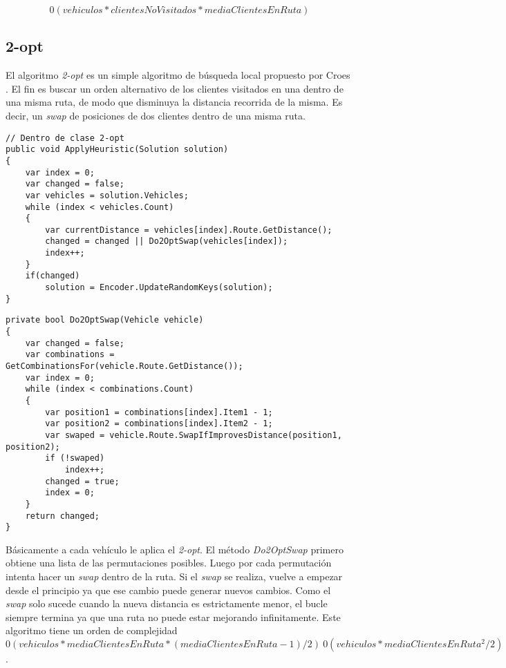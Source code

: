 \begin{equation*}
0(vehiculos * clientesNoVisitados * mediaClientesEnRuta)
\end{equation*}

\subsection{2-opt}

El algoritmo \textit{2-opt} es un simple algoritmo de búsqueda local propuesto por Croes \cite{Croes}. El fin es buscar un orden alternativo de los clientes visitados en una dentro de una misma ruta, de modo que disminuya la distancia recorrida de la misma. Es decir, un \textit{swap} de posiciones de dos clientes dentro de una misma ruta.

\begin{minipage}{\textwidth}
\begin{lstlisting}
// Dentro de clase 2-opt
public void ApplyHeuristic(Solution solution)
{
	var index = 0;
	var changed = false;	
	var vehicles = solution.Vehicles;	
	while (index < vehicles.Count)
	{
		var currentDistance = vehicles[index].Route.GetDistance();
		changed = changed || Do2OptSwap(vehicles[index]);
		index++;
	}
	if(changed)
		solution = Encoder.UpdateRandomKeys(solution);
}
\end{lstlisting}
\end{minipage}

\begin{minipage}{\textwidth}
\begin{lstlisting}
private bool Do2OptSwap(Vehicle vehicle)
{
	var changed = false;	
	var combinations = GetCombinationsFor(vehicle.Route.GetDistance());
	var index = 0;
	while (index < combinations.Count)
	{
		var position1 = combinations[index].Item1 - 1;
		var position2 = combinations[index].Item2 - 1;
		var swaped = vehicle.Route.SwapIfImprovesDistance(position1, position2);
		if (!swaped)
			index++;
		changed = true;
		index = 0;
	}
	return changed;
}
\end{lstlisting}
\end{minipage}

\bigskip

Básicamente a cada vehículo le aplica el \textit{2-opt}. El método \textit{Do2OptSwap} primero obtiene una lista de las permutaciones posibles. Luego por cada permutación intenta hacer un \textit{swap} dentro de la ruta. Si el \textit{swap} se realiza, vuelve a empezar desde el principio ya que ese cambio puede generar nuevos cambios. Como el \textit{swap} solo sucede cuando la nueva distancia es estrictamente menor, el bucle siempre termina ya que una ruta no puede estar mejorando infinitamente. Este algoritmo tiene un orden de complejidad $0(vehiculos * mediaClientesEnRuta  * (mediaClientesEnRuta - 1) / 2) ~ 0 (vehiculos * mediaClientesEnRuta^2 / 2)$.

